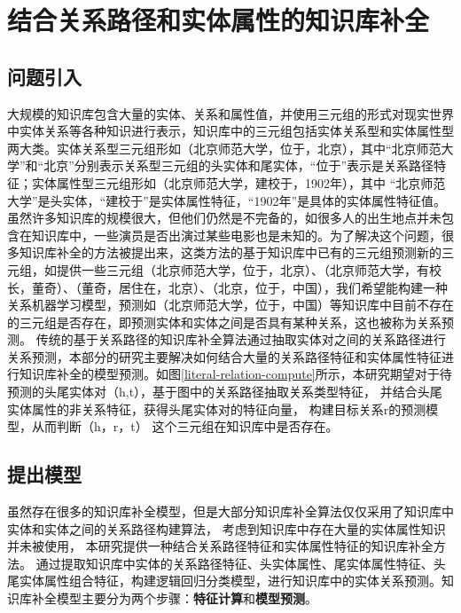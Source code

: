 

\chapter{结合关系路径和实体属性的知识库补全}
\label{cha:kbc-lit-relation}

\section{问题引入}
大规模的知识库包含大量的实体、关系和属性值，并使用三元组的形式对现实世界中实体关系等各种知识进行表示，知识库中的三元组包括实体关系型和实体属性型两大类。实体关系型三元组形如（北京师范大学，位于，北京），其中“北京师范大学”和“北京”分别表示关系型三元组的头实体和尾实体，“位于”表示是关系路径特征；实体属性型三元组形如（北京师范大学，建校于，1902年），其中 “北京师范大学”是头实体，“建校于”是实体属性特征，“1902年”是具体的实体属性特征值。
虽然许多知识库的规模很大，但他们仍然是不完备的，如很多人的出生地点并未包含在知识库中，一些演员是否出演过某些电影也是未知的。为了解决这个问题，很多知识库补全的方法被提出来，这类方法的基于知识库中已有的三元组预测新的三元组，如提供一些三元组（北京师范大学，位于，北京）、（北京师范大学，有校长，董奇）、（董奇，居住在，北京）、（北京，位于，中国），我们希望能构建一种关系机器学习模型，预测如（北京师范大学，位于，中国）等知识库中目前不存在的三元组是否存在，即预测实体和实体之间是否具有某种关系，这也被称为关系预测。
传统的基于关系路径的知识库补全算法通过抽取实体对之间的关系路径进行关系预测，本部分的研究主要解决如何结合大量的关系路径特征和实体属性特征进行知识库补全的模型预测。如图\ref{literal-relation-compute}所示，本研究期望对于待预测的头尾实体对（h,t），基于图中的关系路径抽取关系类型特征，
并结合头尾实体属性的非关系特征，获得头尾实体对的特征向量，
构建目标关系r的预测模型，从而判断（h，r，t）
这个三元组在知识库中是否存在。

\section{提出模型}
虽然存在很多的知识库补全模型，但是大部分知识库补全算法仅仅采用了知识库中实体和实体之间的关系路径构建算法，
考虑到知识库中存在大量的实体属性知识并未被使用，
本研究提供一种结合关系路径特征和实体属性特征的知识库补全方法。
通过提取知识库中实体的关系路径特征、头实体属性、尾实体属性特征、头尾实体属性组合特征，构建逻辑回归分类模型，进行知识库中的实体关系预测。知识库补全模型主要分为两个步骤：\textbf{特征计算}和\textbf{模型预测}。

